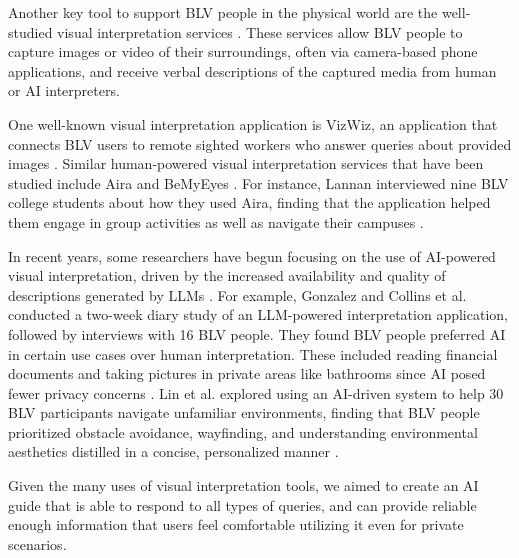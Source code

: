 Another key tool to support BLV people in the physical world are the well-studied visual interpretation services \cite{gonzalez2024scenedesc, gonzalez2025towards, garaj2003pedestrian, lannan2019campus, bigham2010vizwiz}. These services allow BLV people to capture images or video of their surroundings, often via camera-based phone applications, and receive verbal descriptions of the captured media from human or AI interpreters.

One well-known visual interpretation application is VizWiz, an application that connects BLV users to remote sighted workers who answer queries about provided images \cite{bigham2010vizwiz}. Similar human-powered visual interpretation services that have been studied include Aira and BeMyEyes \cite{garaj2003pedestrian, lannan2019campus}. For instance, Lannan interviewed nine BLV college students about how they used Aira, finding that the application helped them engage in group activities as well as navigate their campuses \cite{lannan2019campus}.

In recent years, some researchers have begun focusing on the use of AI-powered visual interpretation, driven by the increased availability and quality of descriptions generated by LLMs \cite{gonzalez2024scenedesc, gonzalez2025towards, lin2025viptour}. For example, Gonzalez and Collins et al. conducted a two-week diary study of an LLM-powered interpretation application, followed by interviews with 16 BLV people. They found BLV people preferred AI in certain use cases over human interpretation. These included reading financial documents and taking pictures in private areas like bathrooms since AI posed fewer privacy concerns \cite{gonzalez2024scenedesc}. Lin et al. explored using an AI-driven system to help 30 BLV participants navigate unfamiliar environments, finding that BLV people prioritized obstacle avoidance, wayfinding, and understanding environmental aesthetics distilled in a concise, personalized manner \cite{lin2025viptour}.

Given the many uses of visual interpretation tools, we aimed to create an AI guide that is able to respond to all types of queries, and can provide reliable enough information that users feel comfortable utilizing it even for private scenarios.